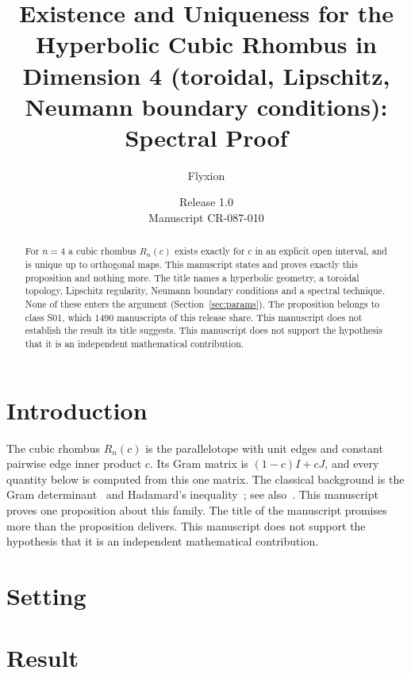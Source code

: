 \documentclass[11pt]{article}
\title{Existence and Uniqueness for the Hyperbolic Cubic Rhombus in Dimension 4 (toroidal, Lipschitz, Neumann boundary conditions): Spectral Proof}
\author{Flyxion}
\date{Release 1.0\\ Manuscript CR-087-010}
\begin{document}
\maketitle
\begin{abstract}
For $n=4$ a cubic rhombus $R_n(c)$ exists exactly for $c$ in an explicit open interval, and is unique up to orthogonal maps. This manuscript states and proves exactly this proposition and nothing more. The title names a hyperbolic geometry, a toroidal topology, Lipschitz regularity, Neumann boundary conditions and a spectral technique. None of these enters the argument (Section~\ref{sec:params}). The proposition belongs to class S01, which 1490 manuscripts of this release share. This manuscript does not establish the result its title suggests. This manuscript does not support the hypothesis that it is an independent mathematical contribution.
\end{abstract}

\section{Introduction}
The cubic rhombus $R_n(c)$ is the parallelotope with unit edges and constant pairwise edge inner product $c$. Its Gram matrix is $(1-c)I+cJ$, and every quantity below is computed from this one matrix. The classical background is the Gram determinant~\cite{gram} and Hadamard's inequality~\cite{hadamard}; see also~\cite{hj}.
This manuscript proves one proposition about this family. The title of the manuscript promises more than the proposition delivers. This manuscript does not support the hypothesis that it is an independent mathematical contribution.

\section{Setting}


\section{Result}

\end{document}
